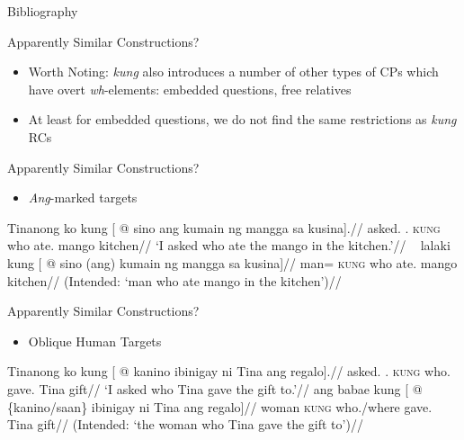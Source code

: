 \documentclass[pdf]{beamer}
\newcommand{\g}[1]{\textsc{#1}}
\newcommand{\Ng}{\Gen}
\newcommand{\Ko}{\Fsg.\Ng}    \newcommand{\Namin}{\Fpl.\Excl.\Ng}
\begin{document}
\begin{frame}{Bibliography}


\end{frame}

\begin{frame}{Apparently Similar Constructions?}
  \begin{itemize}
    \item Worth Noting: \textit{kung} also introduces a number of other types of CPs which have overt \textit{wh}-elements: embedded questions, free relatives
    \item At least for embedded questions, we do not find the same restrictions as \textit{kung} RCs
  \end{itemize}
\end{frame}

\begin{frame}{Apparently Similar Constructions?}
  \begin{itemize}
    \item \textit{Ang}-marked targets
  \end{itemize}
  \ex\begingl
    \gla  Tinanong ko kung [ @ sino ang kumain ng mangga sa kusina].//
    \glb  asked.\Pv{} \Ko{} \g{kung} who \Nom{} ate.\Av{} \Gen{} mango \Obl{} kitchen//
    \glft `I asked who ate the mango in the kitchen.'//
  \endgl
  \xe
  \ex~\ljudge{*}\begingl
    \gla  lalaki kung [ @ sino (ang) kumain ng mangga sa kusina]//
    \glb  man=\Lk{} \g{kung} who \Nom{} ate.\Av{} \Gen{} mango \Obl{} kitchen//
    \glft (Intended: `man who ate mango in the kitchen')//
  \endgl
  \xe
\end{frame}

\begin{frame}{Apparently Similar Constructions?}
  \begin{itemize}
    \item Oblique Human Targets
  \end{itemize}
  \ex\begingl
    \gla  Tinanong ko kung [ @ kanino ibinigay ni Tina ang regalo].//
    \glb  asked.\Pv{} \Ko{} \g{kung} who.\Obl{} gave.\Cv{} \Gen{} Tina \Nom{} gift//
    \glft `I asked who Tina gave the gift to.'//
  \endgl
  \xe
  \ex\ljudge{*}\begingl
    \gla  ang babae kung [ @ \{kanino/saan\} ibinigay ni Tina ang regalo]//
    \glb  \Nom{} woman \g{kung} who.\Obl{}/where gave.\Cv{} \Gen{} Tina \Nom{} gift//
    \glft (Intended: `the woman who Tina gave the gift to')//
  \endgl
  \xe
\end{frame}
\end{document}
